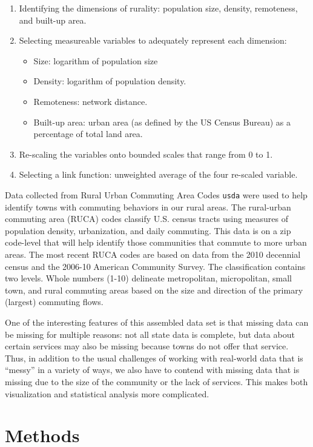 \documentclass[letterpaper,inpress]{jdsart}
\begin{document}
\begin{enumerate}
\item Identifying the dimensions of rurality: population size, density, remoteness, and built-up area.
\item Selecting measureable variables to adequately represent each dimension:
    \begin{itemize}
        \item Size: logarithm of population size
        \item Density: logarithm of population density.
        \item Remoteness: network distance.
        \item Built-up area: urban area (as defined by the US Census Bureau) as a percentage of total land area.
    \end{itemize}
\item Re-scaling the variables onto bounded scales that range from 0 to 1.
\item Selecting a link function: unweighted average of the four re-scaled variable.
\end{enumerate}

Data collected from Rural Urban Commuting Area Codes \texttt{usda} were used to help identify towns with commuting behaviors in our rural areas. The rural-urban commuting area (RUCA) codes classify U.S. census tracts using measures of population density, urbanization, and daily commuting. This data is on a zip code-level that will help identify those communities that commute to more urban areas. The most recent RUCA codes are based on data from the 2010 decennial census and the 2006-10 American Community Survey. The classification contains two levels. Whole numbers (1-10) delineate metropolitan, micropolitan, small town, and rural commuting areas based on the size and direction of the primary (largest) commuting flows.

One of the interesting features of this assembled data set is that missing data can be missing for multiple reasons: not all state data is complete, but data about certain services may also be missing because towns do not offer that service.
Thus, in addition to the usual challenges of working with real-world data that is ``messy'' in a variety of ways, we also have to contend with missing data that is missing due to the size of the community or the lack of services. This makes both visualization and statistical analysis more complicated.

\hypertarget{methods}{%
\section{Methods}\label{methods}}
\end{document}

